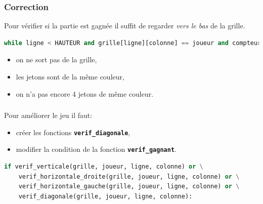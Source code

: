\documentclass[svgnames,11pt]{beamer}
\begin{document}
\begin{frame}[fragile]
    \frametitle{Correction}
\begin{aretenir}[Remarque]
Pour vérifier si la partie est gagnée il suffit de regarder \emph{vers le bas} de la grille.
\end{aretenir}
    \begin{center}
    \begin{lstlisting}[language=Python , basicstyle=\ttfamily\small, xleftmargin=2em, xrightmargin=2em]
while ligne < HAUTEUR and grille[ligne][colonne] == joueur and compteur < 4:
\end{lstlisting}
    \end{center}
\begin{itemize}
    \item on ne sort pas de la grille,
    \item les jetons sont de la même couleur,
    \item on n'a pas encore 4 jetons de même couleur.
\end{itemize}
\end{frame}
\begin{frame}[fragile]
    \frametitle{}

    Pour améliorer le jeu il faut:
    \begin{itemize}
        \item créer les fonctions \textbf{\texttt{verif\_diagonale}},
        \item modifier la condition de la fonction \textbf{\texttt{verif\_gagnant}}.
    \end{itemize}
    \begin{center}
    \begin{lstlisting}[language=Python , basicstyle=\ttfamily\small, xleftmargin=.5em, xrightmargin=-1.5em]
if verif_verticale(grille, joueur, ligne, colonne) or \
    verif_horizontale_droite(grille, joueur, ligne, colonne) or \
    verif_horizontale_gauche(grille, joueur, ligne, colonne) or \
    verif_diagonale(grille, joueur, ligne, colonne):
\end{lstlisting}
        \end{center}
\end{frame}
\end{document}
